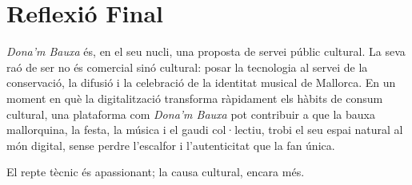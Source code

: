 \section{Reflexió Final}

\textit{Dona'm Bauxa} és, en el seu nucli, una proposta de servei públic cultural. La seva raó de ser no és comercial sinó cultural: posar la tecnologia al servei de la conservació, la difusió i la celebració de la identitat musical de Mallorca. En un moment en què la digitalització transforma ràpidament els hàbits de consum cultural, una plataforma com \textit{Dona'm Bauxa} pot contribuir a que la bauxa mallorquina, la festa, la música i el gaudi col·lectiu, trobi el seu espai natural al món digital, sense perdre l'escalfor i l'autenticitat que la fan única.

El repte tècnic és apassionant; la causa cultural, encara més.
